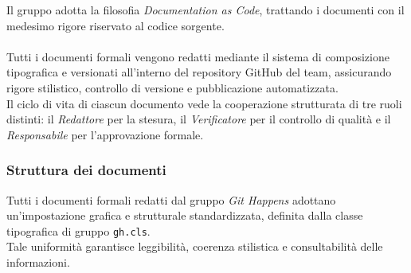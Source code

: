 \noindent Il gruppo adotta la filosofia \textit{Documentation as Code}, trattando i documenti con il medesimo rigore riservato al codice sorgente. \\
\\
Tutti i documenti formali vengono redatti mediante il sistema di composizione tipografica \term{\LaTeX}{} e versionati all'interno del repository GitHub del team, assicurando rigore stilistico, controllo di versione e pubblicazione automatizzata. \\
Il ciclo di vita di ciascun documento vede la cooperazione strutturata di tre ruoli distinti: il \textit{Redattore} per la stesura, il \textit{Verificatore} per il controllo di qualità e il \textit{Responsabile} per l'approvazione formale.

\subsubsection{Struttura dei documenti}
Tutti i documenti formali redatti dal gruppo \textit{Git Happens} adottano un'impostazione grafica e strutturale standardizzata, definita dalla classe tipografica di gruppo \texttt{gh.cls}. \\
Tale uniformità garantisce leggibilità, coerenza stilistica e consultabilità delle informazioni.

